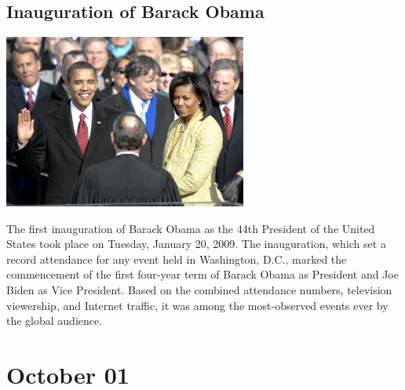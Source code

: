\documentclass[11pt]{report}
\begin{document}
\subsection{Inauguration of Barack Obama}
\vspace{2mm}\begin{center}\includegraphics[width=8cm]{./img/obamaInaug.jpg}\end{center}
The first inauguration of Barack Obama as the 44th President of the United States took place on Tuesday, January 20, 2009. The inauguration, which set a record attendance for any event held in Washington, D.C., marked the commencement of the first four-year term of Barack Obama as President and Joe Biden as Vice President. Based on the combined attendance numbers, television viewership, and Internet traffic, it was among the most-observed events ever by the global audience.

\section{October 01}
\end{document}
